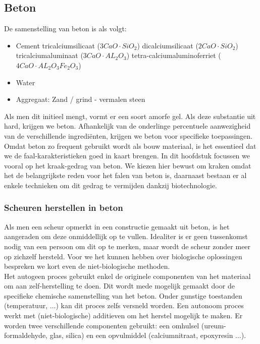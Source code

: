 \documentclass[a4paper,kul]{kulakarticle} %
\begin{document}
\subsection{Beton}
De samenstelling van beton is als volgt:
\begin{itemize}
	\item Cement
	\subitem tricalciumsilicaat ($3CaO\cdot SiO_2$)
	\subitem dicalciumsilicaat ($2CaO\cdot SiO_2$)
	\subitem tricalciumaluminaat ($3CaO\cdot AL_2O_3$)
	\subitem tetra-calciumaluminoferriet ($4CaO\cdot AL_2O_3Fe_2O_3$)
	\item Water
	\item Aggregaat: Zand / grind - vermalen steen
\end{itemize}
Als men dit initieel mengt, vormt er een soort amorfe gel. Als deze substantie uit hard, krijgen we beton. Afhankelijk van de onderlinge percentuele aanwezigheid van de verschillende ingrediënten, krijgen we beton voor specifieke toepassingen. 
\\
Omdat beton zo frequent gebruikt wordt als bouw materiaal, is het essentieel dat we de faal-karakteristieken goed in kaart brengen. In dit hoofdstuk focussen we vooral op het kraak-gedrag van beton. We kiezen hier bewust om kraken omdat het de belangrijkste reden voor het falen van beton is, daarnaast bestaan er al enkele technieken om dit gedrag te vermijden dankzij biotechnologie. 
\subsubsection{Scheuren herstellen in beton}
Als men een scheur opmerkt in een constructie gemaakt uit beton, is het aangeraden om deze onmiddellijk op te vullen. Idealiter is er geen tussenkomst nodig van een persoon om dit op te merken, maar wordt de scheur zonder meer op zichzelf hersteld. Voor we het kunnen hebben over biologische oplossingen bespreken we kort even de niet-biologische methoden.
\\
Het autogeen proces gebruikt enkel de originele componenten van het materiaal om aan zelf-herstelling te doen. Dit wordt mede mogelijk gemaakt door de specifieke chemische samenstelling van het beton. Onder gunstige toestanden (temperatuur, $\ldots$) kan dit proces zelfs versneld worden. Een autonoom proces werkt met (niet-biologische) additieven om het herstel mogelijk te maken. Er worden twee verschillende componenten gebruikt: een omhulsel (ureum-formaldehyde, glas, silica) en een opvulmiddel (calciumnitraat, epoxyresin $\ldots$).
\end{document}
